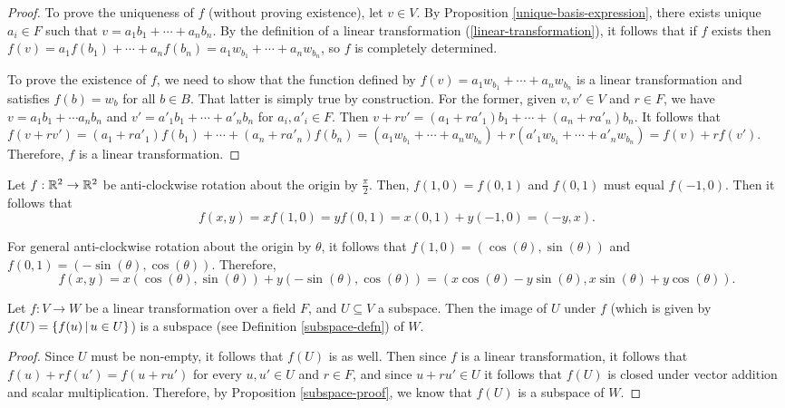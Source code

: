 \begin{proof}\proofbreak

To prove the uniqueness of $f$ (without proving existence), let $v \in V$. By Proposition \ref{unique-basis-expression}, there exists unique $a_i \in F$ such that $v = a_1b_1 + \cdots + a_nb_n$. By the definition of a linear transformation (\ref{linear-transformation}), it follows that if $f$ exists then $f(v) = a_1f(b_1) + \cdots + a_nf(b_n) = a_1w_{b_1} + \cdots + a_nw_{b_n}$, so $f$ is completely determined.

To prove the existence of $f$, we need to show that the function defined by $f(v) = a_1w_{b_1} + \cdots + a_nw_{b_n}$ is a linear transformation and satisfies $f(b) = w_b$ for all $b \in B$. That latter is simply true by construction. For the former, given $v, v' \in V$ and $r \in F$, we have $v = a_1b_1 + \cdots a_nb_n$ and $v' = a'_1b_1 + \cdots + a'_nb_n$ for $a_i, a'_i \in F$. Then $v + rv' = (a_1 + ra'_1)b_1 + \cdots + (a_n + ra'_n)b_n$. It follows that $f(v + rv') = (a_1 + ra'_1)f(b_1) + \cdots + (a_n + ra'_n)f(b_n) = (a_1w_{b_1} + \cdots + a_nw_{b_n}) + r(a'_1w_{b_1} + \cdots + a'_nw_{b_n}) = f(v) + rf(v')$. Therefore, $f$ is a linear transformation.
\end{proof}

\begin{exmp}
    Let $f: \mathbb{R}^2 \to \mathbb{R}^2$ be anti-clockwise rotation about the origin by $\frac{\pi}{2}$. Then, $f(1, 0) = f(0, 1)$ and $f(0, 1)$ must equal $f(-1, 0)$. Then it follows that \[f(x, y) = xf(1, 0) = yf(0, 1) = x(0, 1) + y(-1, 0) = (-y, x).\]
\end{exmp}

\begin{exmp}
    For general anti-clockwise rotation about the origin by $\theta$, it follows that $f(1, 0) = (\cos(\theta), \sin(\theta))$ and $f(0, 1) = (-\sin(\theta), \cos(\theta))$. Therefore, \[f(x, y) = x(\cos(\theta), \sin(\theta)) + y(-\sin(\theta), \cos(\theta)) = (x\cos(\theta) - y\sin(\theta), x\sin(\theta) + y\cos(\theta)).\]
\end{exmp}

\begin{prop}
    Let $f: V \to W$ be a linear transformation over a field $F$, and $U \subseteq V$ a subspace. Then the image of $U$ under $f$ (which is given by $f(U) = \left\{f(u) \,\middle|\, u \in U\right\}$) is a subspace (see Definition \ref{subspace-defn}) of $W$.
\end{prop}

\begin{proof}
    Since $U$ must be non-empty, it follows that $f(U)$ is as well. Then since $f$ is a linear transformation, it follows that $f(u) + rf(u') = f(u + ru')$ for every $u, u' \in U$ and $r \in F$, and since $u + ru' \in U$ it follows that $f(U)$ is closed under vector addition and scalar multiplication. Therefore, by Proposition \ref{subspace-proof}, we know that $f(U)$ is a subspace of $W$.
\end{proof}


